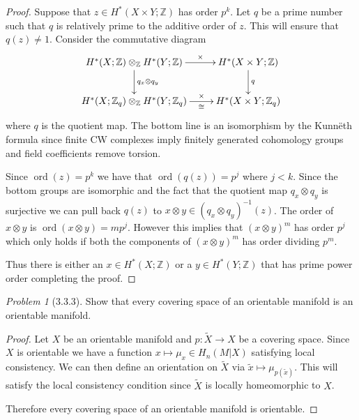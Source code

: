 \documentclass[10pt]{article}
\newcommand{\sk}{\vskip 10mm}
\newcommand{\bb}[1]{\mathbb{#1}}
\newcommand{\wt}[1]{\widetilde{#1}}
\DeclareMathOperator{\ord}{ord}
\theoremstyle{remark}
\newtheorem{problem}{Problem}
\begin{document}
\begin{proof}
  Suppose that $z\in H^*(X\times Y;\bb{Z})$ has order $p^k$. Let $q$ be a prime number
  such that $q$ is relatively prime to the additive order of $z$. This will
  ensure that $q(z)\neq 1$. Consider the commutative diagram
  \[
    \xymatrix{
      H^*(X;\bb{Z})\otimes_{\bb{Z}} H^*(Y;\bb{Z}) \ar[r]^-\times \ar[d]^{q_x\otimes q_y}& H^*(X\times Y;\bb{Z}) \ar[d]^{ q}\\
      H^*(X;\bb{Z}_q)\otimes_{\bb{Z}} H^*(Y;\bb{Z}_q) \ar[r]^-\times_-\cong & H^*(X\times Y;\bb{Z}_q)\\
    }
  \]
  where $q$ is the quotient map. The bottom line is an isomorphism by the
  Kunn\"eth formula since finite CW complexes imply finitely generated cohomology
  groups and field coefficients remove torsion.

  Since $\ord(z)=p^k$ we have that $\ord(q(z))=p^j$ where $j<k$. Since the bottom
  groups are isomorphic and the fact that the quotient map $q_x\otimes q_y$ is surjective
  we can pull back $q(z)$ to $x\otimes y\in(q_x\otimes q_y)^{-1}(z)$. The order of $x\otimes y$ is
  $\ord(x\otimes y)=m p^j$. However this implies that $(x\otimes y)^m$ has order $p^j$ which
  only holds if both the components of $(x\otimes y)^m$ has order dividing $p^m$.

  Thus there is either an $x\in H^*(X;\bb{Z})$ or a $y\in H^*(Y;\bb{Z})$ that has
  prime power order completing the proof.
\end{proof}

\sk

\begin{problem}[3.3.3]
  Show that every covering space of an orientable manifold is an orientable
  manifold.
\end{problem} 

\begin{proof}
  Let $X$ be an orientable manifold and $p:\wt{X}\rightarrow X$ be a covering space.
  Since $X$ is orientable we have a function $x\mapsto \mu_x\in H_n(M|X)$ satisfying
  local consistency. We can then define an orientation on $\wt{X}$ via
  $\wt{x}\mapsto \mu_{p(\wt{x})}$. This will satisfy the local consistency condition
  since $\wt{X}$ is locally homeomorphic to $X$.

  Therefore every covering space of an orientable manifold is orientable.
\end{proof}
\end{document}
